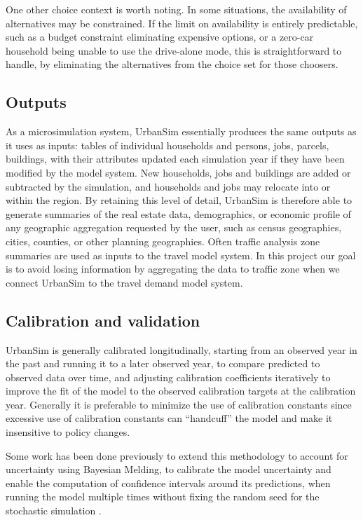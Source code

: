One other choice context is worth noting. In some situations, the availability of alternatives may be constrained. If the limit on availability is entirely predictable, such as a budget constraint eliminating expensive options, or a zero-car household being unable to use the drive-alone mode, this is straightforward to handle, by eliminating the alternatives from the choice set for those choosers.


\subsection{Outputs}

As a microsimulation system, UrbanSim essentially produces the same outputs as it uses as inputs: tables of individual households and persons, jobs, parcels, buildings, with their attributes updated each simulation year if they have been modified by the model system.  New households, jobs and buildings are added or subtracted by the simulation, and households and jobs may relocate into or within the region.  By retaining this level of detail, UrbanSim is therefore able to generate summaries of the real estate data, demographics, or economic profile of any geographic aggregation requested by the user, such as census geographies, cities, counties, or other planning geographies.  Often traffic analysis zone summaries are used as inputs to the travel model system.  In this project our goal is to avoid losing information by aggregating the data to traffic zone when we connect UrbanSim to the travel demand model system.


\subsection{Calibration and validation}

UrbanSim is generally calibrated longitudinally, starting from an observed year in the past and running it to a later observed year, to compare predicted to observed data over time, and adjusting calibration coefficients iteratively to improve the fit of the model to the observed calibration targets at the calibration year.  Generally it is preferable to minimize the use of calibration constants since excessive use of calibration constants can \enquote{handcuff} the model and make it insensitive to policy changes.

Some work has been done previously to extend this methodology to account for uncertainty using Bayesian Melding, to calibrate the model uncertainty and enable the computation of confidence intervals around its predictions, when running the model multiple times without fixing the random seed for the stochastic simulation \citep{sevcikova-tra-2009, sevcikova-tra-2011}.